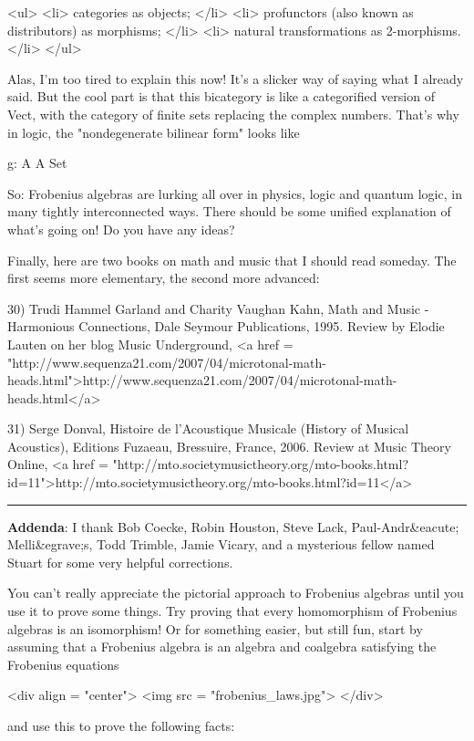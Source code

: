 <ul>
<li>
categories as objects;
</li>
<li>
profunctors (also known as distributors) as morphisms;
</li>
<li>
natural transformations as 2-morphisms.
</li>
</ul>

Alas, I'm too tired to explain this now!  It's a slicker way of saying
what I already said.  But the cool part is that this bicategory is
like a categorified version of Vect, with the category of finite sets
replacing the complex numbers.  That's why in logic, the
"nondegenerate bilinear form" looks like

g: A \times  A \to  Set

So: Frobenius algebras are lurking all over in physics, logic
and quantum logic, in many tightly interconnected ways.  There 
should be some unified explanation of what's going on!  Do you have 
any ideas?

Finally, here are two books on math and music that I should read
someday.  The first seems more elementary, the second more advanced:

30) Trudi Hammel Garland and Charity Vaughan Kahn, Math and Music -
Harmonious Connections, Dale Seymour Publications, 1995.  Review 
by Elodie Lauten on her blog Music Underground, 
<a href = "http://www.sequenza21.com/2007/04/microtonal-math-heads.html">http://www.sequenza21.com/2007/04/microtonal-math-heads.html</a>

31) Serge Donval, Histoire de l'Acoustique Musicale (History of 
Musical Acoustics), Editions Fuzaeau, Bressuire, France, 2006.
Review at Music Theory Online, 
<a href = "http://mto.societymusictheory.org/mto-books.html?id=11">http://mto.societymusictheory.org/mto-books.html?id=11</a>

\par\noindent\rule{\textwidth}{0.4pt}
 
\textbf{Addenda}: I thank Bob Coecke, Robin Houston, Steve Lack,
Paul-Andr&eacute; Melli&egrave;s,
Todd Trimble, Jamie Vicary, and a mysterious fellow named Stuart for
some very helpful corrections.

You can't really appreciate the pictorial approach to Frobenius
algebras until you use it to prove some things.  Try proving that 
every homomorphism of Frobenius algebras is an isomorphism!  Or
for something easier, but still fun, start by assuming
that a Frobenius algebra is an algebra and coalgebra satisfying
the Frobenius equations

<div align = "center">
<img src = "frobenius_laws.jpg">
</div>

and use this to prove the following facts:

